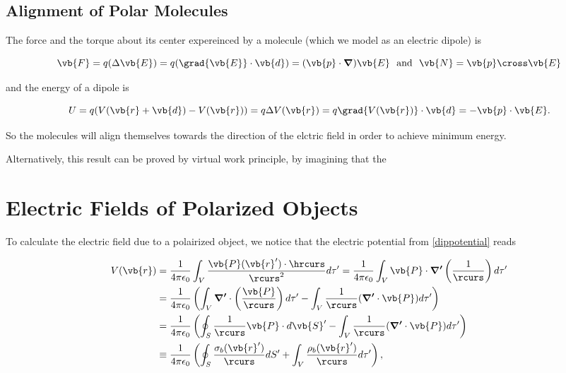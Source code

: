 \documentclass[english,a4paper,12pt]{report}
\begin{document}
\subsection{Alignment of Polar Molecules} \label{alignpolar} 

The force and the torque about its center expereinced by a molecule (which we model as an electric dipole) is 

\begin{equation}
    \vb{F} = q(\Delta \vb{E} ) = q (\grad{\vb{E} } \cdot \vb{d}) = (\vb{p}  \cdot \boldsymbol{\nabla }) \vb{E} ~\text { and }~ \vb{N} = \vb{p} \cross \vb{E}
\end{equation}

and the energy of a dipole is 

\begin{equation}
    U = q(V(\vb{r} + \vb{d} ) - V(\vb{r} )) = q\Delta V(\vb{r} ) = q\grad{V(\vb{r} )}\cdot \vb{d} = - \vb{p} \cdot \vb{E}. 
\end{equation}

So the molecules will align themselves towards the direction of the elctric field in order to achieve minimum energy. 

Alternatively, this result can be proved by virtual work principle, by imagining that the 

\section{Electric Fields of Polarized Objects}

To calculate the electric field due to a polairized object, we notice that the electric potential from \cref{dippotential} reads

\begin{equation}
    \begin{aligned} 
    V(\vb{r} ) &= \frac{1}{4\pi \epsilon_0} \int_{V}^{} \frac{\vb{P} (\vb{r} ')\cdot \hrcurs }{\rcurs ^2}d\tau ' = \frac{1}{4\pi \epsilon_0} \int_{V}^{} \vb{P} \cdot \boldsymbol{\nabla '}\left( \frac{1}{\rcurs }  \right) d\tau ' \\
    &= \frac{1}{4\pi \epsilon_0} \left( \int_{V}^{} \boldsymbol{\nabla '} \cdot \left( \frac{\vb{P} }{\rcurs }  \right) d\tau ' - \int_{V}^{} \frac{1}{\rcurs } (\boldsymbol{\nabla '} \cdot \vb{P}  ) d\tau ' \right) \\
    &= \frac{1}{4\pi \epsilon_0} \left( \oint_{S} \frac{1}{\rcurs }\vb{P} \cdot d\vb{S} '  - \int_{V}^{} \frac{1}{\rcurs } (\boldsymbol{\nabla '} \cdot \vb{P}  ) d\tau ' \right) \\
    &\equiv  \frac{1}{4\pi \epsilon_0} \left( \oint_{S} \frac{\sigma _{b}(\vb{r} ') }{\rcurs } dS' + \int_{V}^{} \frac{\rho _{b} (\vb{r} ')}{\rcurs } d\tau ' \right),
    \end{aligned} 
\end{equation}
\end{document}
